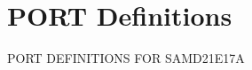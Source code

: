 \hypertarget{group___s_a_m_d21_e17_a__port}{}\section{P\+O\+RT Definitions}
\label{group___s_a_m_d21_e17_a__port}
P\+O\+RT D\+E\+F\+I\+N\+I\+T\+I\+O\+NS F\+OR S\+A\+M\+D21\+E17A 